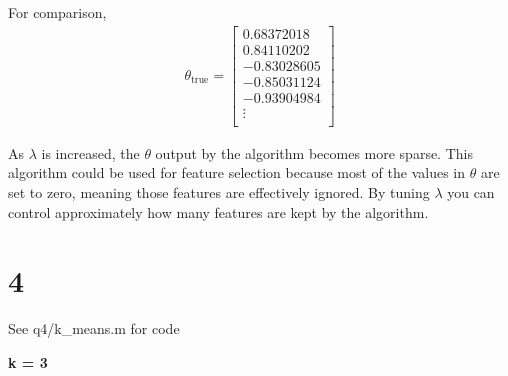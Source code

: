 \documentclass[11pt]{article}
\begin{document}
For comparison, 
\begin{align*}
    \theta_{\text{true}} = 
    \begin{bmatrix}
         0.68372018 \\
         0.84110202 \\
        -0.83028605 \\
        -0.85031124 \\
        -0.93904984 \\
        \vdots \\
    \end{bmatrix}
\end{align*}

As $\lambda$ is increased, the $\theta$ output by the algorithm becomes more sparse. This algorithm could be used for feature selection because most of the values in $\theta$ are set to zero, meaning those features are effectively ignored. By tuning $\lambda$ you can control approximately how many features are kept by the algorithm.

\section*{4}

See q4/k\_means.m for code
\newpage

\textbf{k = 3}
\end{document}
